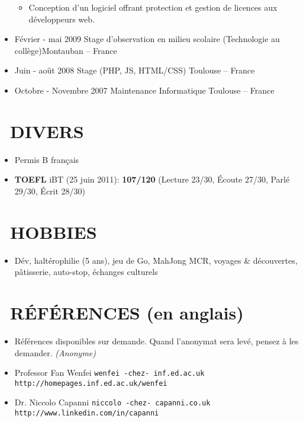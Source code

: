 \documentclass{res}
\begin{document}
\begin{resume}
\begin{itemize}
\begin{itemize}
			\item[] Conception d'un logiciel offrant protection et gestion de licences aux d\'eveloppeurs web.
		\end{itemize}
		\item[] F\'evrier - mai 2009 \tabto{5cm} Stage d'observation en milieu scolaire (Technologie au coll\`ege)\hfill Montauban -- France
		\item[] Juin - ao\^ut 2008 \tabto{5cm} Stage (PHP, JS, HTML/CSS) \hfill Toulouse -- France
		\item[] Octobre - Novembre 2007 \tabto{5cm} Maintenance Informatique \hfill Toulouse -- France
	\end{itemize}
		
\section{\faMagic~DIVERS}
	\begin{itemize}
		\item[] Permis B fran\c{c}ais
		\item[] \textbf{TOEFL} iBT (25 juin 2011): \textbf{107/120} (Lecture 23/30, \'Ecoute 27/30, Parl\'e 29/30, \'Ecrit 28/30)		
		    \end{itemize} 
 
\section{\faGamepad~HOBBIES}
	\begin{itemize}
		\item[] D\'ev, halt\'erophilie (5 ans), jeu de Go, MahJong MCR, voyages \& d\'ecouvertes, p\^atisserie, auto-stop, \'echanges culturels
	\end{itemize}

\section{\faUserCheck~R\'EF\'ERENCES (en anglais)}
\ifisanon 
    \begin{itemize}
			\item[] R\'ef\'erences disponibles sur demande. Quand l'anonymat sera lev\'e, pensez \`a les demander. \textit{(Anonyme)}
    \end{itemize}
\else
		\begin{itemize}
			\item[] Professor Fan Wenfei \tabto{4cm} \texttt{wenfei -chez- inf.ed.ac.uk} \hfill \texttt{http://homepages.inf.ed.ac.uk/wenfei}
			\item[] Dr. Niccolo Capanni \tabto{4cm} \texttt{niccolo -chez- capanni.co.uk} \hfill \texttt{http://www.linkedin.com/in/capanni}
		\end{itemize}
\fi
\end{resume}
\end{document}
